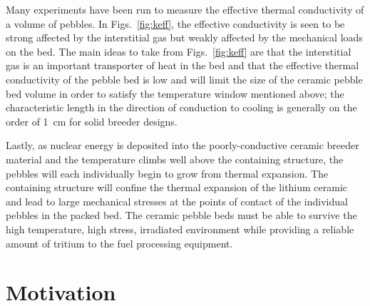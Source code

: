 Many experiments have been run to measure the effective thermal conductivity of a volume of pebbles. In Figs.~\ref{fig:keff}, the effective conductivity is seen to be strong affected by the interstitial gas but weakly affected by the mechanical loads on the bed. The main ideas to take from Figs.~\ref{fig:keff} are that the interstitial gas is an important transporter of heat in the bed and that the effective thermal conductivity of the pebble bed is low and will limit the size of the ceramic pebble bed volume in order to satisfy the temperature window mentioned above; the characteristic length in the direction of conduction to cooling is generally on the order of 1~cm for solid breeder designs.


Lastly, as nuclear energy is deposited into the poorly-conductive ceramic breeder material and the temperature climbs well above the containing structure, the pebbles will each individually begin to grow from thermal expansion. The containing structure will confine the thermal expansion of the lithium ceramic and lead to large mechanical stresses at the points of contact of the individual pebbles in the packed bed. The ceramic pebble beds must be able to survive the high temperature, high stress, irradiated environment while providing a reliable amount of tritium to the fuel processing equipment.






\section{Motivation}\label{sec:motivation}


